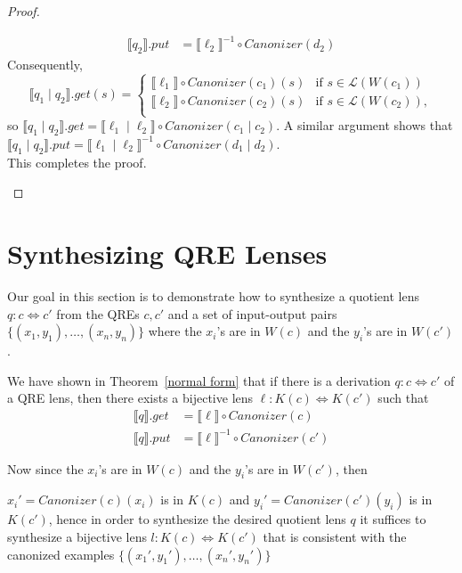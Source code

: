 \documentclass{svproc}
\newcommand{\sep}{\ensuremath{\; | \;}}
\newcommand{\canonizer}{\ensuremath{\mathit{Canonizer}}}
\begin{document}
\begin{proof}
\begin{enumerate}
\begin{align*}
\llbracket q_2 \rrbracket.put &= {\llbracket \ell_2 \rrbracket}^{-1} \circ
\canonizer(d_2)
\end{align*}
Consequently,
$$
  \llbracket q_1 \sep q_2 \rrbracket.get(s) = 
  \begin{cases}
  \llbracket \ell_1 \rrbracket \circ
\canonizer(c_1) (s) & \text{if } s \in \mathcal{L}(W(c_1))\\
  \llbracket \ell_2 \rrbracket \circ
\canonizer(c_2) (s) & \text{if } s \in \mathcal{L}(W(c_2)),\\
  \end{cases}$$
  so $\llbracket q_1 \sep q_2 \rrbracket.get = \llbracket \ell_1 \sep
  \ell_2 \rrbracket \circ \canonizer(c_1 \sep c_2)$. A similar argument shows
  that $\llbracket q_1 \sep q_2 \rrbracket.put = \llbracket \ell_1 \sep
  \ell_2 \rrbracket^{-1} \circ \canonizer(d_1 \sep d_2)$.\\
  This completes the proof.
\end{enumerate}
\end{proof}

\section{Synthesizing QRE Lenses}
\label{synth}
Our goal in this section is to demonstrate how to synthesize a quotient lens
$q: c \Leftrightarrow c'$ from the QREs $c, c'$ and a set of input-output pairs
$\{(x_1, y_1), \ldots, (x_n, y_n)\}$ where the $x_i$'s are in $W(c)$ and the
$y_i$'s are in $W(c')$.

We have shown in Theorem~\ref{normal form} that if there is a derivation $q : c
\Leftrightarrow c'$ of a QRE lens, then there exists a bijective lens $\ell :
K(c) \Leftrightarrow K(c')$ such that
\begin{align*}
\llbracket q \rrbracket.get &= \llbracket \ell \rrbracket\circ \canonizer(c)\\
\llbracket q \rrbracket.put &= \llbracket \ell \rrbracket^{-1} \circ
\canonizer(c')
\end{align*}

Now since the $x_i$'s are in $W(c)$ and the $y_i$'s are in $W(c')$, then

\noindent ${x_i}' = \canonizer(c)(x_i)$ is in $K(c)$ and ${y_i}' =
\canonizer(c')(y_i)$ is in $K(c')$, hence in order to synthesize the desired
quotient lens $q$ it suffices to synthesize a bijective lens $l : K(c)
\Leftrightarrow K(c')$ that is consistent with the canonized examples
$\{({x_1}', {y_1}'), \ldots, ({x_n}', {y_n}')\}$
\end{document}

